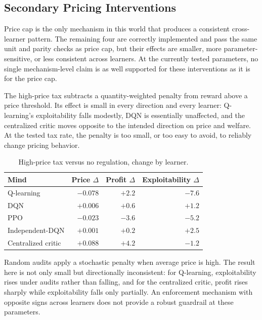 \documentclass[11pt]{article}
\begin{document}
\subsection{Secondary Pricing Interventions}

Price cap is the only mechanism in this world that produces a consistent
cross-learner pattern. The remaining four are correctly implemented and pass
the same unit and parity checks as price cap, but their effects are smaller,
more parameter-sensitive, or less consistent across learners. At the currently
tested parameters, no single mechanism-level claim is as well supported for
these interventions as it is for the price cap.

The high-price tax subtracts a quantity-weighted penalty from reward above a
price threshold. Its effect is small in every direction and every learner:
Q-learning's exploitability falls modestly, DQN is essentially unaffected, and
the centralized critic moves opposite to the intended direction on price and welfare. At
the tested tax rate, the penalty is too small, or too easy to avoid, to reliably
change pricing behavior.

\begin{table}[h]
\centering
\begin{tabular}{lrrr}
\toprule
Mind & Price \(\Delta\) & Profit \(\Delta\) & Exploitability \(\Delta\) \\
\midrule
Q-learning & \(-0.078\) & \(+2.2\) & \(-7.6\) \\
DQN & \(+0.006\) & \(+0.6\) & \(+1.2\) \\
PPO & \(-0.023\) & \(-3.6\) & \(-5.2\) \\
Independent-DQN & \(+0.001\) & \(+0.2\) & \(+2.5\) \\
Centralized critic & \(+0.088\) & \(+4.2\) & \(-1.2\) \\
\bottomrule
\end{tabular}
\caption{High-price tax versus no regulation, change by learner.}
\label{tab:pricing-tax}
\end{table}

Random audits apply a stochastic penalty when average price is high. The result
here is not only small but directionally inconsistent: for Q-learning,
exploitability rises under audits rather than falling, and for the centralized
critic, profit rises sharply while exploitability falls only partially. An
enforcement mechanism with opposite signs across learners does not provide a
robust guardrail at these parameters.
\end{document}
